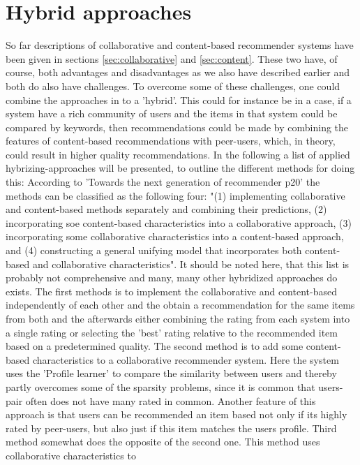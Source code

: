 \section{Hybrid approaches}
So far descriptions of collaborative and content-based recommender systems have been given in sections \ref{sec:collaborative} and \ref{sec:content}. These two have, of course, both advantages and disadvantages as we also have described earlier and both do also have challenges. To overcome some of these challenges, one could combine the approaches in to a 'hybrid'. This could for instance be in a case, if a system have a rich community of users and the items in that system could be compared by keywords, then recommendations could be made by combining the features of content-based recommendations with peer-users, which, in theory, could result in higher quality recommendations.
In the following a list of applied hybrizing-approaches will be presented, to outline the different methods for doing this:
According to 'Towards the next generation of recommender p20' the methods can be classified as the following four: "(1) implementing collaborative and content-based methods separately and combining their predictions, (2) incorporating soe content-based characteristics into a collaborative approach, (3) incorporating some collaborative characteristics into a content-based approach, and (4) constructing a general unifying model that incorporates both content-based and collaborative characteristics". It should be noted here, that this list is probably not comprehensive and many, many other hybridized approaches do exists. 
The first methods is to implement the collaborative and content-based independently of each other and the obtain a recommendation for the same items from both and the afterwards either combining the rating from each system into a single rating or selecting the 'best' rating relative to the recommended item based on a predetermined quality. 
The second method is to add some content-based characteristics to a collaborative recommender system. Here the system uses the 'Profile learner' to compare the similarity between users and thereby partly overcomes some of the sparsity problems, since it is common that users-pair often does not have many rated in common. Another feature of this approach is that users can be recommended an item based not only if its highly rated by peer-users, but also just if this item matches the users profile. 
Third method somewhat does the opposite of the second one. This method uses collaborative characteristics to  
